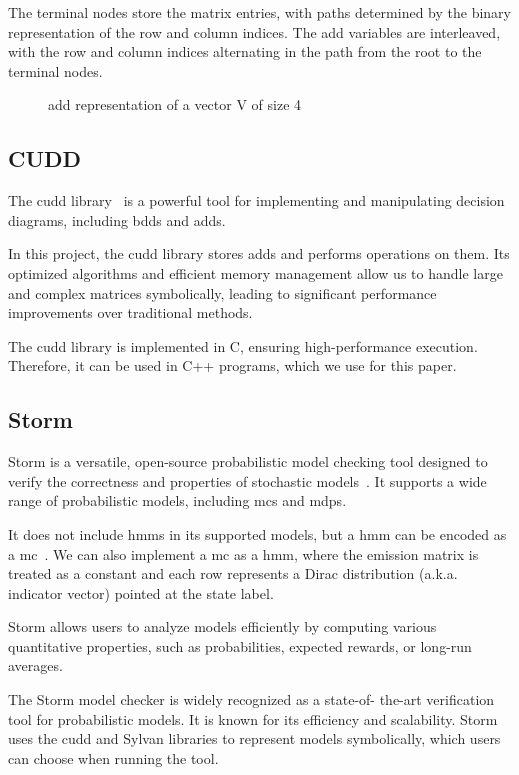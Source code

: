The terminal nodes store the matrix entries, with paths determined by the binary representation of the row and column indices.
The \gls{add} variables are interleaved, with the row and column indices alternating in the path from the root to the terminal nodes.


\begin{figure}[htb!]
    \centering
    
    \caption{\gls{add} representation of a vector V of size 4}
    \label{fig:add_vector}
\end{figure}


\subsection{CUDD}\label{subsec:cudd}
The \gls{cudd} library~\cite{somenzi1997cudd} is a powerful tool for implementing and manipulating decision diagrams, including \glspl{bdd} and \glspl{add}.

In this project, the \gls{cudd} library stores \glspl{add} and performs operations on them.
Its optimized algorithms and efficient memory management allow us to handle large and complex matrices symbolically, leading to significant performance improvements over traditional methods.

The \gls{cudd} library is implemented in C, ensuring high-performance execution.
Therefore, it can be used in C++ programs, which we use for this paper.

\subsection{Storm}\label{subsec:storm}
Storm is a versatile, open-source probabilistic model checking tool designed to verify the correctness and properties of stochastic models~\cite{hensel2021probabilistic}.
It supports a wide range of probabilistic models, including \glspl{mc} and \glspl{mdp}.

It does not include \glspl{hmm} in its supported models, but a \gls{hmm} can be encoded as a \gls{mc}~\cite{rabiner1989tutorial}.
We can also implement a \gls{mc} as a \gls{hmm}, where the emission matrix is treated as a constant and each row represents a Dirac distribution (a.k.a. indicator vector) pointed at the state label.

Storm allows users to analyze models efficiently by computing various quantitative properties, such as probabilities, expected rewards, or long-run averages.

The Storm model checker is widely recognized as a state-of-
the-art verification tool for probabilistic models.
It is known for its efficiency and scalability.
Storm uses the \gls{cudd} and Sylvan libraries to represent models symbolically, which users can choose when running the tool.


